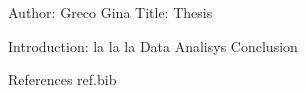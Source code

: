Author: Greco Gina
Title: Thesis

Introduction: la la la
Data
Analisys
Conclusion


References
ref.bib
